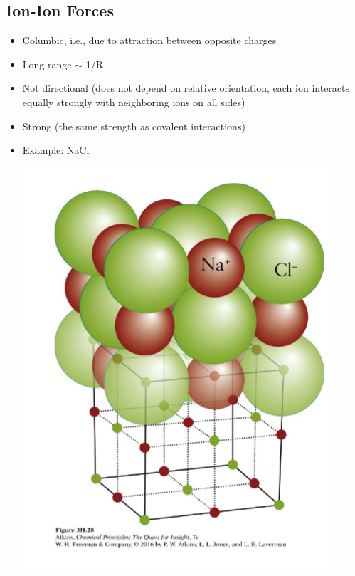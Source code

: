 \documentclass[10pt]{article}
\begin{document}
\subsection*{Ion-Ion Forces}
\begin{itemize}
    \item \"Columbic\", i.e., due to attraction between opposite charges
    \item Long range $\sim$ 1/R
    \item Not directional (does not depend on relative orientation, each ion interacts equally strongly with neighboring ions on all sides)
    \item Strong (the same strength as covalent interactions)
    \item Example: NaCl
    \begin{center}
        \includegraphics[scale=0.5]{W2_4.png}
    \end{center}
\end{itemize}
\end{document}
